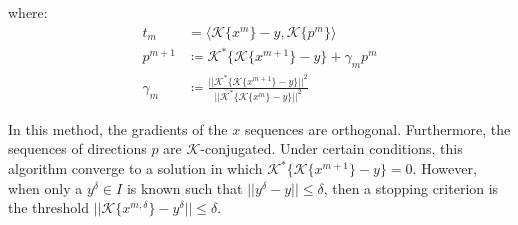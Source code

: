			\noindent where:
			\begin{align}
				t_m &= \langle \mathcal{K}\{x^m\}-y, \mathcal{K}\{p^m\} \rangle \label{eq:3:linear:cg:3} \\
				p^{m+1} &\coloneqq \mathcal{K}^*\{\mathcal{K}\{x^{m+1}\}-y\} + \gamma_m p^m \label{eq:3:linear:cg:4} \\
				\gamma_m &\coloneqq \frac{||\mathcal{K}^*\{\mathcal{K}\{x^{m+1}\}-y\}||^2}{||\mathcal{K}^*\{\mathcal{K}\{x^{m}\}-y\}||^2} \label{eq:3:linear:cg:5}
			\end{align}
		
			In this method, the gradients of the $x$ sequences are orthogonal. Furthermore, the sequences of directions $p$ are $\mathcal{K}$-conjugated. Under certain conditions, this algorithm converge to a solution in which $\mathcal{K}^*\{\mathcal{K}\{x^{m+1}\}-y\} = 0$. However, when only a $y^\delta\in I$ is known such that $||y^\delta-y||\le\delta$, then a stopping criterion is the threshold $||\mathcal{K}\{x^{m,\delta}\}-y^\delta||\le\delta$.
			
